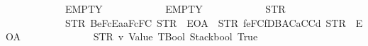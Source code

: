 \begin{isabellebody}
\ \ \ \ \ \ \ \ \ \ \ \ EMPTY\isanewline
\ \ \ \ \ \ \ \ \ \ \ \ EMPTY\isanewline
\ \ \ \ \ \ \ \ \ \ \ \ {\isacharparenleft}{\kern0pt}STR\ {\isacharprime}{\kern0pt}{\isacharprime}{\kern0pt}{}{\isacharprime}{\kern0pt}{\isacharprime}{\kern0pt}{\isacharparenright}{\kern0pt}\isanewline
\ \ \ \ \ \ \ \ \ \ \ \ {\isacharbrackleft}{\kern0pt}{\isacharparenleft}{\kern0pt}STR\ {\isacharprime}{\kern0pt}{\isacharprime}{\kern0pt}{}{}{}Be{}{}{}{}FcEa{}{}aF{}{}{}{}{}{}{}{}{}c{}{}F{}{}{}{}{}{}C{}{}{}{\isacharprime}{\kern0pt}{\isacharprime}{\kern0pt}{\isacharcomma}{\kern0pt}\ STR\ {\isacharprime}{\kern0pt}{\isacharprime}{\kern0pt}{}{}{}{\isacharprime}{\kern0pt}{\isacharprime}{\kern0pt}{\isacharcomma}{\kern0pt}\ EOA{\isacharcomma}{\kern0pt}\ {}{\isacharparenright}{\kern0pt}{\isacharcomma}{\kern0pt}\ {\isacharparenleft}{\kern0pt}STR\ {\isacharprime}{\kern0pt}{\isacharprime}{\kern0pt}{}{}{}f{}e{}F{}{}{}{}{}C{}{}f{}DB{}AC{}{}{}{}{}a{}CC{}{}{}{}{}d{}{}{\isacharprime}{\kern0pt}{\isacharprime}{\kern0pt}{\isacharcomma}{\kern0pt}\ STR\ {\isacharprime}{\kern0pt}{\isacharprime}{\kern0pt}{}{}{}{\isacharprime}{\kern0pt}{\isacharprime}{\kern0pt}{\isacharcomma}{\kern0pt}\ EOA{\isacharcomma}{\kern0pt}\ {}{\isacharparenright}{\kern0pt}{\isacharbrackright}{\kern0pt}\ \isanewline
\ \ \ \ \ \ \ \ \ \ \ \ {\isacharbrackleft}{\kern0pt}{\isacharparenleft}{\kern0pt}STR\ {\isacharprime}{\kern0pt}{\isacharprime}{\kern0pt}v{}{\isacharprime}{\kern0pt}{\isacharprime}{\kern0pt}{\isacharcomma}{\kern0pt}\ {\isacharparenleft}{\kern0pt}Value\ TBool{\isacharcomma}{\kern0pt}\ Stackbool\ True{\isacharparenright}{\kern0pt}{\isacharparenright}{\kern0pt}{\isacharbrackright}{\kern0pt}\isanewline

\end{isabellebody}
